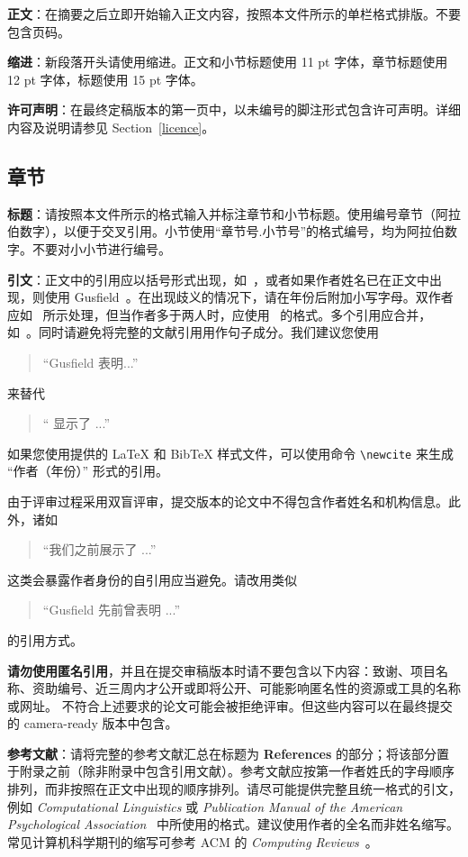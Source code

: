 \documentclass[11pt]{article}
\begin{document}
\begin{CJK*}{UTF8}{gbsn}
{\bf 正文}：在摘要之后立即开始输入正文内容，按照本文件所示的单栏格式排版。不要包含页码。

{\bf 缩进}：新段落开头请使用缩进。正文和小节标题使用 11 pt 字体，章节标题使用 12 pt 字体，标题使用 15 pt 字体。

{\bf 许可声明}：在最终定稿版本的第一页中，以未编号的脚注形式包含许可声明。详细内容及说明请参见 Section~\ref{licence}。
\subsection{章节}

{\bf 标题}：请按照本文件所示的格式输入并标注章节和小节标题。使用编号章节（阿拉伯数字），以便于交叉引用。小节使用“章节号.小节号”的格式编号，均为阿拉伯数字。不要对小小节进行编号。

{\bf 引文}：正文中的引用应以括号形式出现，如~\cite{Gusfield:97}，或者如果作者姓名已在正文中出现，则使用 Gusfield~。在出现歧义的情况下，请在年份后附加小写字母。双作者应如~\cite{Aho:72} 所示处理，但当作者多于两人时，应使用~\cite{Chandra:81} 的格式。多个引用应合并，如~\cite{Gusfield:97,Aho:72}。同时请避免将完整的文献引用用作句子成分。我们建议您使用
\begin{quote}
``Gusfield  表明...''
\end{quote}
来替代
\begin{quote}
  ``\cite{Gusfield:97} 显示了 ...''
\end{quote}

如果您使用提供的 \LaTeX{} 和 Bib\TeX{} 样式文件，可以使用命令 \verb|\newcite| 来生成 “作者（年份）” 形式的引用。

由于评审过程采用双盲评审，提交版本的论文中不得包含作者姓名和机构信息。此外，诸如
\begin{quote}
``我们之前展示了 \cite{Gusfield:97} ...''
\end{quote}
这类会暴露作者身份的自引用应当避免。请改用类似
\begin{quote}
``Gusfield  先前曾表明 ...''
\end{quote}
的引用方式。

\textbf{请勿使用匿名引用}，并且在提交审稿版本时请不要包含以下内容：致谢、项目名称、资助编号、近三周内才公开或即将公开、可能影响匿名性的资源或工具的名称或网址。
不符合上述要求的论文可能会被拒绝评审。但这些内容可以在最终提交的 camera-ready 版本中包含。

\textbf{参考文献}：请将完整的参考文献汇总在标题为 {\bf References} 的部分；将该部分置于附录之前（除非附录中包含引用文献）。参考文献应按第一作者姓氏的字母顺序排列，而非按照在正文中出现的顺序排列。请尽可能提供完整且统一格式的引文，例如 {\em Computational Linguistics\/} 或 {\em Publication Manual of the American Psychological Association\/}~\cite{APA:83} 中所使用的格式。建议使用作者的全名而非姓名缩写。常见计算机科学期刊的缩写可参考 ACM 的 {\em Computing Reviews\/}~\cite{ACM:83}。


\end{CJK*}
\end{document}
